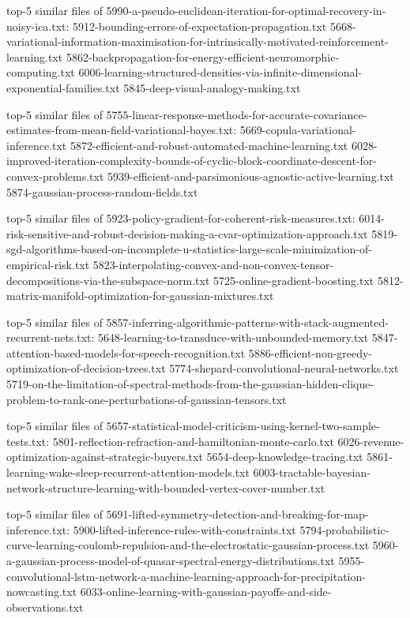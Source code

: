 \documentclass[11pt]{article}
\begin{document}
top-5 similar files of
5990-a-pseudo-euclidean-iteration-for-optimal-recovery-in-noisy-ica.txt:
5912-bounding-errors-of-expectation-propagation.txt
5668-variational-information-maximisation-for-intrinsically-motivated-reinforcement-learning.txt
5862-backpropagation-for-energy-efficient-neuromorphic-computing.txt
6006-learning-structured-densities-via-infinite-dimensional-exponential-families.txt
5845-deep-visual-analogy-making.txt

top-5 similar files of
5755-linear-response-methods-for-accurate-covariance-estimates-from-mean-field-variational-bayes.txt:
5669-copula-variational-inference.txt
5872-efficient-and-robust-automated-machine-learning.txt
6028-improved-iteration-complexity-bounds-of-cyclic-block-coordinate-descent-for-convex-problems.txt
5939-efficient-and-parsimonious-agnostic-active-learning.txt
5874-gaussian-process-random-fields.txt

top-5 similar files of
5923-policy-gradient-for-coherent-risk-measures.txt:
6014-risk-sensitive-and-robust-decision-making-a-cvar-optimization-approach.txt
5819-sgd-algorithms-based-on-incomplete-u-statistics-large-scale-minimization-of-empirical-risk.txt
5823-interpolating-convex-and-non-convex-tensor-decompositions-via-the-subspace-norm.txt
5725-online-gradient-boosting.txt
5812-matrix-manifold-optimization-for-gaussian-mixtures.txt

top-5 similar files of
5857-inferring-algorithmic-patterns-with-stack-augmented-recurrent-nets.txt:
5648-learning-to-transduce-with-unbounded-memory.txt
5847-attention-based-models-for-speech-recognition.txt
5886-efficient-non-greedy-optimization-of-decision-trees.txt
5774-shepard-convolutional-neural-networks.txt
5719-on-the-limitation-of-spectral-methods-from-the-gaussian-hidden-clique-problem-to-rank-one-perturbations-of-gaussian-tensors.txt

top-5 similar files of
5657-statistical-model-criticism-using-kernel-two-sample-tests.txt:
5801-reflection-refraction-and-hamiltonian-monte-carlo.txt
6026-revenue-optimization-against-strategic-buyers.txt
5654-deep-knowledge-tracing.txt
5861-learning-wake-sleep-recurrent-attention-models.txt
6003-tractable-bayesian-network-structure-learning-with-bounded-vertex-cover-number.txt

top-5 similar files of
5691-lifted-symmetry-detection-and-breaking-for-map-inference.txt:
5900-lifted-inference-rules-with-constraints.txt
5794-probabilistic-curve-learning-coulomb-repulsion-and-the-electrostatic-gaussian-process.txt
5960-a-gaussian-process-model-of-quasar-spectral-energy-distributions.txt
5955-convolutional-lstm-network-a-machine-learning-approach-for-precipitation-nowcasting.txt
6033-online-learning-with-gaussian-payoffs-and-side-observations.txt
\end{document}
